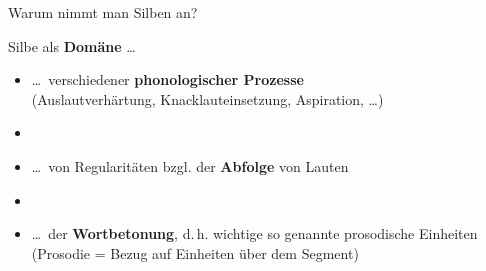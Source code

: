 
\begin{frame}

Warum nimmt man Silben an?

Silbe als \textbf{Domäne} \dots

\begin{itemize}	
	\item \dots\ verschiedener \textbf{phonologischer Prozesse}\\
               (\zB Auslautverhärtung, Knacklauteinsetzung, Aspiration, \dots )
	
	\item[] 
	
	\item \dots\ von Regularitäten bzgl. der \textbf{Abfolge} von Lauten
	
	\item[]
	
	\item \dots\ der \textbf{Wortbetonung}, d.\,h. wichtige so genannte prosodische Einheiten (Prosodie = Bezug auf Einheiten über dem Segment)
\end{itemize}

\end{frame}




